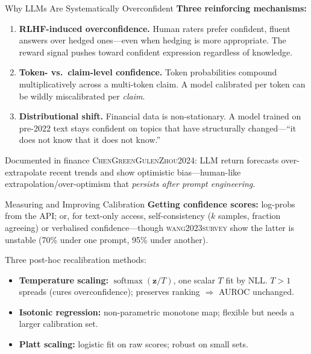 \documentclass[9pt,t]{beamer}
\newcommand{\citesrc}[1]{\textsc{\small #1}}
\providecommand{\citet}[1]{\citesrc{#1}}
\begin{document}
\begin{frame}{Why LLMs Are Systematically Overconfident}
\textbf{Three reinforcing mechanisms:}

\medskip
\begin{enumerate}
  \item \textbf{RLHF-induced overconfidence.} Human raters prefer confident,
        fluent answers over hedged ones---even when hedging is more
        appropriate. The reward signal pushes toward confident expression
        regardless of knowledge.
  \item \textbf{Token- vs.\ claim-level confidence.} Token probabilities
        compound multiplicatively across a multi-token claim. A model
        calibrated per token can be wildly miscalibrated per \emph{claim}.
  \item \textbf{Distributional shift.} Financial data is non-stationary. A
        model trained on pre-2022 text stays confident on topics that have
        structurally changed---``it does not know that it does not know.''
\end{enumerate}

\medskip
\begin{block}{Documented in finance}
\citet{ChenGreenGulenZhou2024}: LLM return forecasts over-extrapolate recent
trends and show optimistic bias---human-like extrapolation/over-optimism that
\emph{persists after prompt engineering}.
\end{block}
\end{frame}

\begin{frame}{Measuring and Improving Calibration}
\textbf{Getting confidence scores:} log-probs from the API; or, for
text-only access, self-consistency ($k$ samples, fraction agreeing) or
verbalised confidence---though \citet{wang2023survey} show the latter is
unstable (70\% under one prompt, 95\% under another).

\medskip
\begin{underhood}
Three post-hoc recalibration methods:
\begin{itemize}
  \item \textbf{Temperature scaling:} $\operatorname{softmax}(\mathbf{z}/T)$,
        one scalar $T$ fit by NLL. $T>1$ spreads (cures overconfidence);
        preserves ranking $\Rightarrow$ AUROC unchanged.
  \item \textbf{Isotonic regression:} non-parametric monotone map; flexible
        but needs a larger calibration set.
  \item \textbf{Platt scaling:} logistic fit on raw scores; robust on small sets.
\end{itemize}
\end{underhood}
\end{frame}
\end{document}
